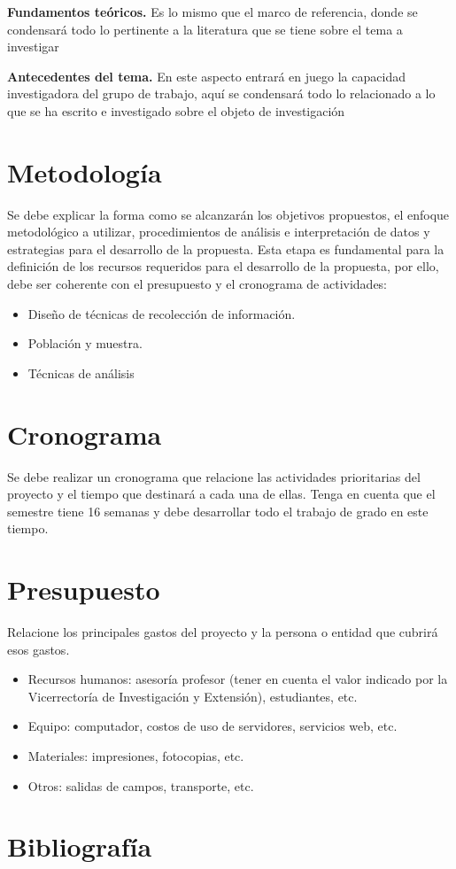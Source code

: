 \documentclass[12pt]{article}
\begin{document}
    \textbf{Fundamentos teóricos.} Es lo mismo que el marco de referencia, donde se condensará todo lo pertinente a la literatura que se tiene sobre el tema a investigar
    
    \textbf{Antecedentes del tema.}  En este aspecto entrará en juego la capacidad investigadora del grupo de trabajo, aquí se condensará todo lo relacionado a lo que se ha escrito e investigado sobre el objeto de investigación

    \section{Metodología}

    Se debe explicar la forma como se alcanzarán los objetivos propuestos, el enfoque metodológico a utilizar, procedimientos de análisis e interpretación de datos y estrategias para el desarrollo de la propuesta.  Esta etapa es fundamental para la definición de los recursos requeridos para el desarrollo de la propuesta, por ello, debe ser coherente con el presupuesto y el cronograma de actividades:
  
    \begin{itemize}
        \item Diseño de técnicas de recolección de información.
        \item Población y muestra.
        \item Técnicas de análisis
    \end{itemize}

    \section{Cronograma}

    Se debe realizar un cronograma que relacione las actividades prioritarias del proyecto y el tiempo que destinará a cada una de ellas.  Tenga en cuenta que el semestre tiene 16 semanas y debe desarrollar todo el trabajo de grado en este tiempo.

    \section{Presupuesto}

    Relacione los principales gastos del proyecto y la persona o entidad que cubrirá esos gastos.

    \begin{itemize}
        
        \item Recursos humanos:  asesoría profesor (tener en cuenta el valor indicado por la Vicerrectoría de Investigación y Extensión), estudiantes, etc.
        \item Equipo:  computador, costos de uso de servidores, servicios web, etc.
        \item Materiales:  impresiones, fotocopias, etc.
        \item Otros:  salidas de campos, transporte, etc.
        
    \end{itemize}

    \pagebreak

    \section{Bibliografía}

    
\end{document}
